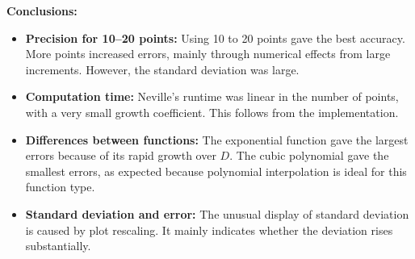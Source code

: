 \textbf{Conclusions:}
\begin{itemize}
    \item \textbf{Precision for 10--20 points:} Using 10 to 20 points gave the best accuracy. More points increased errors, mainly through numerical effects from large increments. However, the standard deviation was large.
    \item \textbf{Computation time:} Neville's runtime was linear in the number of points, with a very small growth coefficient. This follows from the implementation.
    \item \textbf{Differences between functions:} The exponential function gave the largest errors because of its rapid growth over \( D \). The cubic polynomial gave the smallest errors, as expected because polynomial interpolation is ideal for this function type.
    \item \textbf{Standard deviation and error:} The unusual display of standard deviation is caused by plot rescaling. It mainly indicates whether the deviation rises substantially.
\end{itemize}

